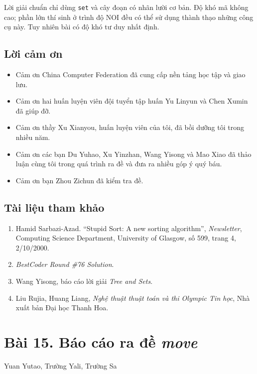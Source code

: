 \documentclass[11pt]{article}
\begin{document}
Lời giải chuẩn chỉ dùng \texttt{set} và cây đoạn có nhãn lười cơ bản. Độ khó
mã không cao; phần lớn thí sinh ở trình độ NOI đều có thể sử dụng thành thạo
những công cụ này. Tuy nhiên bài có độ khó tư duy nhất định.

\subsection*{Lời cảm ơn}

\begin{itemize}
  \item Cảm ơn China Computer Federation đã cung cấp nền tảng học tập và giao
  lưu.
  \item Cảm ơn hai huấn luyện viên đội tuyển tập huấn Yu Linyun và Chen Xumin
  đã giúp đỡ.
  \item Cảm ơn thầy Xu Xianyou, huấn luyện viên của tôi, đã bồi dưỡng tôi
  trong nhiều năm.
  \item Cảm ơn các bạn Du Yuhao, Xu Yinzhan, Wang Yisong và Mao Xiao đã thảo
  luận cùng tôi trong quá trình ra đề và đưa ra nhiều góp ý quý báu.
  \item Cảm ơn bạn Zhou Zichun đã kiểm tra đề.
\end{itemize}

\subsection*{Tài liệu tham khảo}

\begin{enumerate}
  \item Hamid Sarbazi-Azad. ``Stupid Sort: A new sorting algorithm'',
  \emph{Newsletter}, Computing Science Department, University of Glasgow,
  số 599, trang 4, 2/10/2000.
  \item \emph{BestCoder Round \#76 Solution}.
  \item Wang Yisong, báo cáo lời giải \emph{Tree and Sets}.
  \item Liu Rujia, Huang Liang, \emph{Nghệ thuật thuật toán và thi Olympic Tin
  học}, Nhà xuất bản Đại học Thanh Hoa.
\end{enumerate}

\section*{Bài 15. Báo cáo ra đề \emph{move}}

\begin{center}
Yuan Yutao, Trường Yali, Trường Sa
\end{center}
\end{document}

